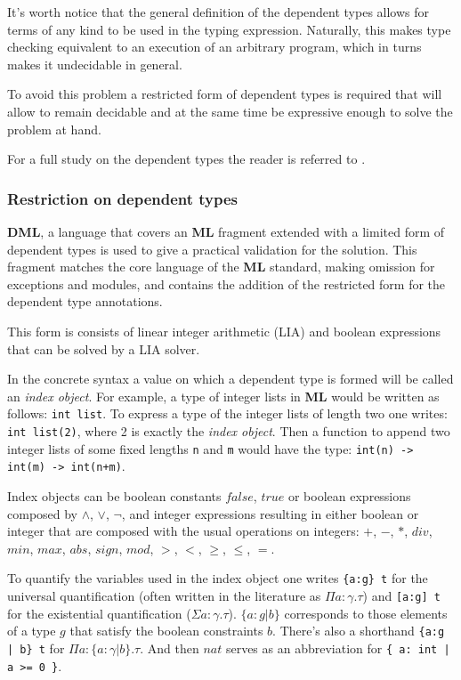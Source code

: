 \documentclass[a4paper,UKenglish]{lipics-v2016}
\begin{document}
It's worth notice that the general definition of the dependent types allows for
terms of any kind to be used in the typing expression. Naturally, this makes
type checking equivalent to an execution of an arbitrary program, which in
turns makes it undecidable in general.

To avoid this problem a restricted form of dependent types is required that
will allow to remain decidable and at the same time be expressive enough to
solve the problem at hand.

For a full study on the dependent types the reader is referred to
\cite{Hofmann97syntaxand}.

\subsubsection{Restriction on dependent types}

\textbf{DML}, a language that covers an \textbf{ML} fragment extended with a
limited form of dependent types is used to give a practical validation for the
solution. This fragment matches the core language of the \textbf{ML} standard,
making omission for exceptions and modules, and contains the addition of the
restricted form for the dependent type annotations.

This form is consists of linear integer arithmetic (LIA) and boolean
expressions that can be solved by a LIA solver.

In the concrete syntax a value on which a dependent type is formed will be
called an \emph{index object}. For example, a type of integer lists in
\textbf{ML} would be written as follows: \texttt{int list}. To express a type
of the integer lists of length two one writes: \texttt{int list(2)}, where 2 is
exactly the \emph{index object}. Then a function to append two integer lists of
some fixed lengths \texttt{n} and \texttt{m} would have the type:
\texttt{int(n) -> int(m) -> int(n+m)}.

Index objects can be boolean constants $false$, $true$ or boolean expressions
composed by $\land$, $\lor$, $\neg$, and integer expressions resulting in
either boolean or integer that are composed with the usual operations on
integers: $+$, $-$, $*$, $div$, $min$, $max$, $abs$, $sign$, $mod$, $>$, $<$,
$\ge$, $\le$, $=$.

To quantify the variables used in the index object one writes \texttt{\{a:g\}
t} for the universal quantification (often written in the literature as $\Pi a:
\gamma.  \tau$) and \texttt{[a:g] t} for the existential quantification
($\Sigma a: \gamma. \tau$).  $\{ a: g | b \}$ corresponds to those elements of
a type $g$ that satisfy the boolean constraints $b$. There's also a shorthand
\texttt{\{a:g | b\} t} for $\Pi a: \{a: \gamma | b\}. \tau$. And then $nat$
serves as an abbreviation for \texttt{\{ a: int | a >= 0 \}}.
\end{document}
